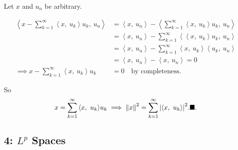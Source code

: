 \begin{solution}[part c]

Let \(x\) and \(u_n\) be arbitrary.

\begin{align*}
{\left\langle {x - \sum_{k=1}^\infty {\left\langle {x},~{u_k} \right\rangle}u_k },~{u_n} \right\rangle}
&=
{\left\langle {x},~{u_n} \right\rangle}
-
{\left\langle {\sum_{k=1}^\infty {\left\langle {x},~{u_k} \right\rangle}u_k },~{u_n} \right\rangle} \\
&=
{\left\langle {x},~{u_n} \right\rangle}
-
\sum_{k=1}^\infty  {\left\langle {{\left\langle {x},~{u_k} \right\rangle}u_k },~{u_n} \right\rangle} \\
&=
{\left\langle {x},~{u_n} \right\rangle}
-
\sum_{k=1}^\infty  {\left\langle {x},~{u_k} \right\rangle} {\left\langle {u_k },~{u_n} \right\rangle} \\
&= {\left\langle {x},~{u_n} \right\rangle} - {\left\langle {x},~{u_n} \right\rangle} = 0 \\
\implies 
x - \sum_{k=1}^\infty {\left\langle {x},~{u_k} \right\rangle}u_k &= 0 \quad\text{by completeness}
.\end{align*}

So
\begin{align*}
x = \sum_{k=1}^\infty {\left\langle {x},~{u_k} \right\rangle} u_k
\implies
{\left\lVert {x} \right\rVert}^2 = \sum_{k=1}^\infty {\left\lvert {{\left\langle {x},~{u_k} \right\rangle}} \right\rvert}^2. \hfill\blacksquare
.\end{align*}

\end{solution}

\hypertarget{lp-spaces}{%
\subsection{\texorpdfstring{4: \(L^p\)
Spaces}{4: L\^{}p Spaces}}\label{lp-spaces}}

